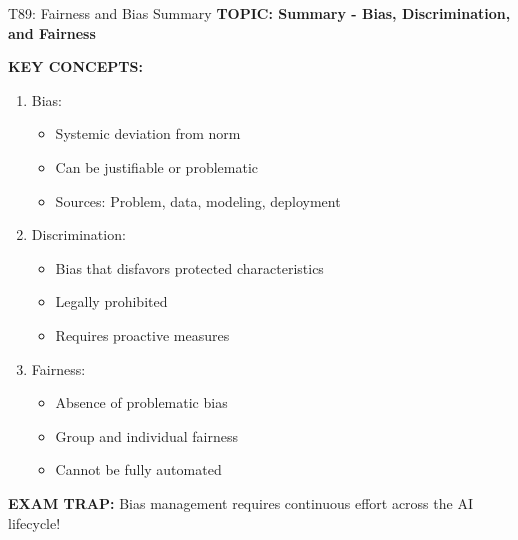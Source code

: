 \documentclass[8pt]{beamer}
\begin{document}
	\begin{frame}{T89: Fairness and Bias Summary}
		\fontsize{6.5}{7.5}\selectfont
		\textbf{TOPIC: Summary - Bias, Discrimination, and Fairness}
		
		\vspace{0.1cm}
		\textbf{KEY CONCEPTS:}
		\begin{enumerate}
			\item \textcolor{myblue}{Bias:}
			\begin{itemize}
				\item Systemic deviation from norm
				\item Can be justifiable or problematic
				\item Sources: Problem, data, modeling, deployment
			\end{itemize}
			\item \textcolor{myblue}{Discrimination:}
			\begin{itemize}
				\item Bias that disfavors protected characteristics
				\item Legally prohibited
				\item Requires proactive measures
			\end{itemize}
			\item \textcolor{myblue}{Fairness:}
			\begin{itemize}
				\item Absence of problematic bias
				\item Group and individual fairness
				\item Cannot be fully automated
			\end{itemize}
		\end{enumerate}
		
		\textcolor{myred}{\textbf{EXAM TRAP:}} Bias management requires \textcolor{myblue}{continuous effort across the AI lifecycle}!
	\end{frame}
	
\end{document}
